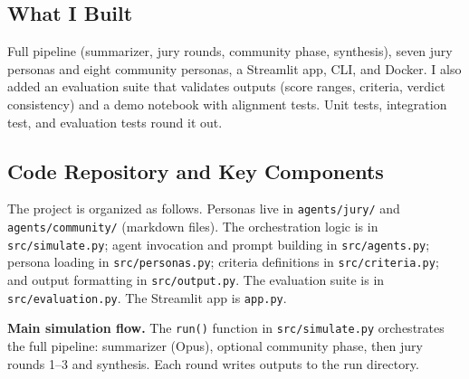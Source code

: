 \documentclass[
  11pt,
]{article}
\begin{document}
\subsection{What I Built}\label{what-i-built}

Full pipeline (summarizer, jury rounds, community phase, synthesis),
seven jury personas and eight community personas, a Streamlit app, CLI,
and Docker. I also added an evaluation suite that validates outputs
(score ranges, criteria, verdict consistency) and a demo notebook with
alignment tests. Unit tests, integration test, and evaluation tests
round it out.

\subsection{Code Repository and Key
Components}\label{code-repository-and-key-components}

The project is organized as follows. Personas live in
\texttt{agents/jury/} and \texttt{agents/community/} (markdown files).
The orchestration logic is in \texttt{src/simulate.py}; agent invocation
and prompt building in \texttt{src/agents.py}; persona loading in
\texttt{src/personas.py}; criteria definitions in
\texttt{src/criteria.py}; and output formatting in
\texttt{src/output.py}. The evaluation suite is in
\texttt{src/evaluation.py}. The Streamlit app is \texttt{app.py}.

\textbf{Main simulation flow.} The \texttt{run()} function in
\texttt{src/simulate.py} orchestrates the full pipeline: summarizer
(Opus), optional community phase, then jury rounds 1--3 and synthesis.
Each round writes outputs to the run directory.
\end{document}
